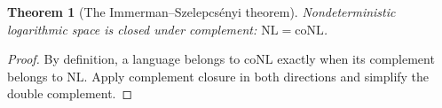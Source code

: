 \documentclass[11pt]{article}
\newtheorem{theorem}{Theorem}
\theoremstyle{definition}
\begin{document}
\begin{theorem}[The Immerman–Szelepcsényi theorem]\leavevmode
Nondeterministic logarithmic space is closed under complement:
$\mathrm{NL}=\mathrm{coNL}$.

\end{theorem}
\begin{proof}\leavevmode
By definition, a language belongs to $\mathrm{coNL}$ exactly when its complement belongs to $\mathrm{NL}$. Apply complement closure in both directions and simplify the double complement.\qedhere
\end{proof}
\end{document}
